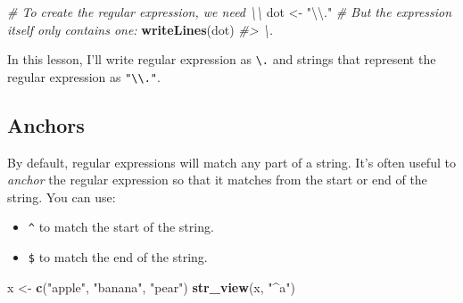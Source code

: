 \documentclass[]{book}
\newenvironment{Shaded}{\begin{snugshade}}{\end{snugshade}}
\newcommand{\CharTok}[1]{\textcolor[rgb]{0.31,0.60,0.02}{#1}}
\newcommand{\CommentTok}[1]{\textcolor[rgb]{0.56,0.35,0.01}{\textit{#1}}}
\newcommand{\KeywordTok}[1]{\textcolor[rgb]{0.13,0.29,0.53}{\textbf{#1}}}
\newcommand{\NormalTok}[1]{#1}
\newcommand{\StringTok}[1]{\textcolor[rgb]{0.31,0.60,0.02}{#1}}
\providecommand{\tightlist}{%
  \setlength{\itemsep}{0pt}\setlength{\parskip}{0pt}}
\begin{document}
\begin{Shaded}
\begin{Highlighting}[]
\CommentTok{# To create the regular expression, we need \textbackslash{}\textbackslash{}}
\NormalTok{dot <-}\StringTok{ "}\CharTok{\textbackslash{}\textbackslash{}}\StringTok{."}
\CommentTok{# But the expression itself only contains one:}
\KeywordTok{writeLines}\NormalTok{(dot)}
\CommentTok{#> \textbackslash{}.}
\end{Highlighting}
\end{Shaded}

In this lesson, I'll write regular expression as \texttt{\textbackslash{}.} and strings that represent the regular expression as \texttt{"\textbackslash{}\textbackslash{}."}.

\hypertarget{anchors}{%
\subsection{Anchors}\label{anchors}}

By default, regular expressions will match any part of a string. It's often useful to \emph{anchor} the regular expression so that it matches from the start or end of the string. You can use:

\begin{itemize}
\tightlist
\item
  \texttt{\^{}} to match the start of the string.
\item
  \texttt{\$} to match the end of the string.
\end{itemize}

\begin{Shaded}
\begin{Highlighting}[]
\NormalTok{x <-}\StringTok{ }\KeywordTok{c}\NormalTok{(}\StringTok{"apple"}\NormalTok{, }\StringTok{"banana"}\NormalTok{, }\StringTok{"pear"}\NormalTok{)}
\KeywordTok{str_view}\NormalTok{(x, }\StringTok{"^a"}\NormalTok{)}
\end{Highlighting}
\end{Shaded}

\hypertarget{htmlwidget-36aa3d2a04d42bbc2145}{}

\begin{Shaded}
\end{Shaded}

\hypertarget{htmlwidget-febe03efa1a2d8d52a86}{}
\end{document}
